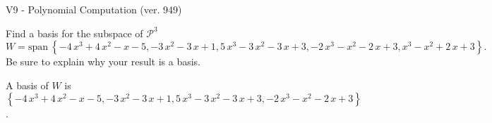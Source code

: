 \begin{exercise}
  \begin{exerciseTitle}V9 - Polynomial Computation (ver. 949)\end{exerciseTitle}
  \begin{exerciseStatement}
    Find a basis for the subspace of \(\mathcal{P}^3\) 
\[W=\mathrm{span}\ \left\{-4 \, x^{3} + 4 \, x^{2} - x - 5 , -3 \, x^{2} - 3 \, x + 1 , 5 \, x^{3} - 3 \, x^{2} - 3 \, x + 3 , -2 \, x^{3} - x^{2} - 2 \, x + 3 , x^{3} - x^{2} + 2 \, x + 3\right\}.\]
 Be sure to explain why your result is a basis.


  \end{exerciseStatement}
  \begin{exerciseAnswer}
   A basis of \(W\) is  \(\left\{-4 \, x^{3} + 4 \, x^{2} - x - 5 , -3 \, x^{2} - 3 \, x + 1 , 5 \, x^{3} - 3 \, x^{2} - 3 \, x + 3 , -2 \, x^{3} - x^{2} - 2 \, x + 3\right\}\).
  


  \end{exerciseAnswer}
\end{exercise}